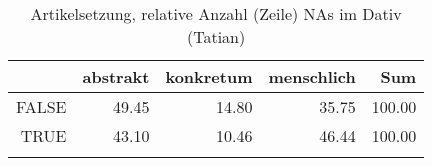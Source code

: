 \begin{table}[ht]
\centering
\begin{tabular}{rrrrr}
  \lsptoprule
 & abstrakt & konkretum & menschlich & Sum \\ 
  \midrule
FALSE & 49.45 & 14.80 & 35.75 & 100.00 \\ 
  TRUE & 43.10 & 10.46 & 46.44 & 100.00 \\ 
   \lspbottomrule
\end{tabular}
\caption{Artikelsetzung, relative Anzahl (Zeile) NAs im Dativ (Tatian)} 
\end{table}
